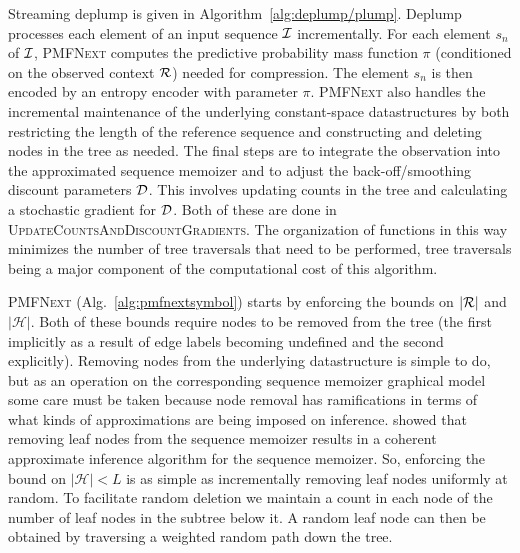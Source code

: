 Streaming deplump is given in Algorithm~\ref{alg:deplump/plump}.  Deplump processes each element of an input sequence $\IS$ incrementally.  For each element $s_n$ of $\IS$, \textsc{PMFNext} computes the predictive probability mass function $\pi$ (conditioned on the observed context $\RS$) needed for compression.  The element $s_n$ is then encoded by an entropy encoder with parameter $\pi$.  \textsc{PMFNext} also handles the incremental maintenance of the underlying constant-space datastructures by both restricting the length of the reference sequence and constructing and deleting nodes in the tree as needed.  The final steps are to integrate the observation into the approximated sequence memoizer and to adjust the back-off/smoothing discount parameters $\D$.  This involves updating counts in the tree and calculating a stochastic gradient for $\D$.  Both of these are done in \textsc{UpdateCountsAndDiscountGradients}. %
The organization of functions in this way minimizes the number of tree traversals that need to be performed, tree traversals being a major component of the computational cost of this algorithm.

\textsc{PMFNext} (Alg.~\ref{alg:pmfnextsymbol}) starts by enforcing the bounds on $|\RS|$ and $|\mathcal{H}|$.  Both of these bounds require nodes to be removed from the tree (the first implicitly as a result of edge labels becoming undefined and the second explicitly).  Removing nodes from the underlying datastructure is simple to do, but as an operation on the corresponding sequence memoizer graphical model some care must be taken because node removal has ramifications in terms of what kinds of approximations are being imposed on inference.  \cite{Bartlett2010} showed that removing leaf nodes from the sequence memoizer results in a coherent approximate inference algorithm for the sequence memoizer.  So, enforcing the bound on $| \mathcal{H} | < L$ is as simple as incrementally removing leaf nodes uniformly at random.  To facilitate random deletion we maintain a count in each node of the number of leaf nodes in the subtree below it.  A random leaf node can then be obtained by traversing a weighted random path down the tree.  


